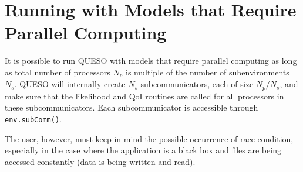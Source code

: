 \section{Running with Models that Require Parallel Computing}

It is possible to run QUESO with models that require parallel computing as long as total number of processors $N_p$ is multiple of the number of subenvironments $N_s$. QUESO will internally create $N_s$ subcommunicators, each of size $N_p/N_s$, and make sure that the likelihood and QoI routines are called for all processors in these subcommunicators.
Each subcommunicator is accessible through \texttt{env.subComm()}.

The user, however, must keep in mind the possible occurrence of race condition, especially in the case where the application is a black box and files are being accessed constantly (data is being written and read).



% 
% 
% 
% 
% 
% 
